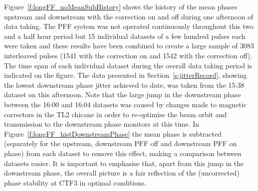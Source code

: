 
Figure~\ref{f:longFF_noMeanSubHistory} shows the history of the mean phases upstream and downstream with the correction on and off during one afternoon of data taking. The PFF system was not operated continuously throughout this two and a half hour period but 15 individual datasets of a few hundred pulses each were taken and these results have been combined to create a large sample of 3083 interleaved pulses (1541 with the correction on and 1542 with the correction off). The time span of each individual dataset during the overall data taking period is indicated on the figure. The data presented in Section~\ref{s:jitterRecord}, showing the lowest downstream phase jitter achieved to date, was taken from the 15:38 dataset on this afternoon. Note that the large jump in the downstream phase between the 16:00 and 16:04 datasets was caused by changes made to magnetic correctors in the TL2 chicane in order to re-optimise the beam orbit and transmission to the downstream phase monitors at this time. In Figure~\ref{f:longFF_histDownstreamPhase} the mean phase is subtracted (separately for the upstream, downstream PFF off and downstream PFF on phase) from each dataset to remove this effect, making a comparison between datasets easier. It is important to emphasise that, apart from this jump in the downstream phase, the overall picture is a fair reflection of the (uncorrected) phase stability at CTF3 in optimal conditions.

